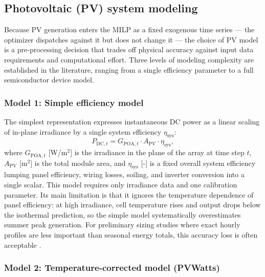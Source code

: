 \documentclass[11pt,a4paper]{report}
\begin{document}


\subsection{Photovoltaic (PV) system modeling}
\label{sub:pv_modeling}

Because PV generation enters the MILP as a fixed exogenous time series --- the optimizer dispatches against it but does not change it --- the choice of PV model is a pre-processing decision that trades off physical accuracy against input data requirements and computational effort.
Three levels of modeling complexity are established in the literature, ranging from a single efficiency parameter to a full semiconductor device model.

\subsubsection{Model 1: Simple efficiency model}

The simplest representation expresses instantaneous DC power as a linear scaling of in-plane irradiance by a single system efficiency $\eta_{\text{sys}}$:
\begin{equation}
    P_{\text{DC},t} = G_{\text{POA},t} \cdot A_{\text{PV}} \cdot \eta_{\text{sys}},
    \label{eq:pv_simple}
\end{equation}
where $G_{\text{POA},t}$ [W/m$^2$] is the irradiance in the plane of the array at time step $t$, $A_{\text{PV}}$ [m$^2$] is the total module area, and $\eta_{\text{sys}}$ [-] is a fixed overall system efficiency lumping panel efficiency, wiring losses, soiling, and inverter conversion into a single scalar.
This model requires only irradiance data and one calibration parameter.
Its main limitation is that it ignores the temperature dependence of panel efficiency: at high irradiance, cell temperature rises and output drops below the isothermal prediction, so the simple model systematically overestimates summer peak generation.
For preliminary sizing studies where exact hourly profiles are less important than seasonal energy totals, this accuracy loss is often acceptable \cite{Ringkjob2018}.

\subsubsection{Model 2: Temperature-corrected model (PVWatts)}
\end{document}
